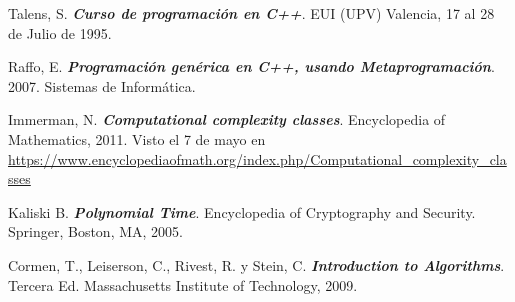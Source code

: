 \begin{thebibliography}{IEEE}
 Talens, S. \textbf{\textit{Curso de programación en C++}}. EUI (UPV) Valencia, 17 al 28 de Julio de 1995. 

 Raffo, E. \textbf{\textit{Programación genérica en C++, usando Metaprogramación}}. 2007. Sistemas de Informática. 

 Immerman, N. \textbf{\textit{Computational complexity classes}}. Encyclopedia of Mathematics, 2011. Visto el 7 de mayo en \url{https://www.encyclopediaofmath.org/index.php/Computational_complexity_classes}

 Kaliski B.  \textbf{\textit{Polynomial Time}}. Encyclopedia of Cryptography and Security. Springer, Boston, MA, 2005.

 Cormen, T., Leiserson, C., Rivest, R. y Stein, C. \textbf{\textit{Introduction to Algorithms}}. Tercera Ed. Massachusetts Institute of Technology, 2009.

\end{thebibliography}

